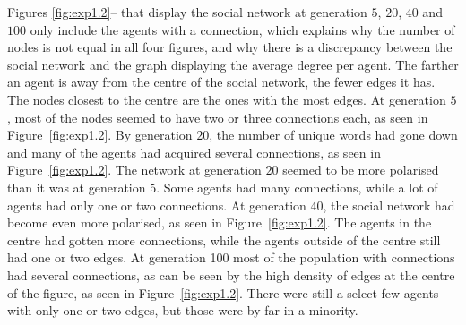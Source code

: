 Figures \ref{fig:exp1.2}-- that display the social network at generation $5$, $20$, $40$ and $100$ only include the agents with a connection, which explains why the number of nodes is not equal in all four figures, and why there is a discrepancy between the social network and the graph displaying the average degree per agent. The farther an agent is away from the centre of the social network, the fewer edges it has. The nodes closest to the centre are the ones with the most edges. At generation $5$, most of the nodes seemed to have two or three connections each, as seen in Figure~\ref{fig:exp1.2}. By generation $20$, the number of unique words had gone down and many of the agents had acquired several connections, as seen in Figure~\ref{fig:exp1.2}. The network at generation $20$ seemed to be more polarised than it was at generation $5$. Some agents had many connections, while a lot of agents had only one or two connections. At generation $40$, the social network had become even more polarised, as seen in Figure~\ref{fig:exp1.2}. The agents in the centre had gotten more connections, while the agents outside of the centre still had one or two edges. At generation 100 most of the population with connections had several connections, as can be seen by the high density of edges at the centre of the figure, as seen in Figure~\ref{fig:exp1.2}. There were still a select few agents with only one or two edges, but those were by far in a minority.


